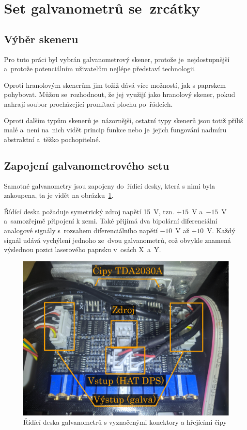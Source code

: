 \section{Set galvanometrů se~zrcátky} \label{sec:my-galvos}
\subsection{Výběr skeneru}
Pro tuto práci byl vybrán galvanometrový skener, protože je~nejdostupnější a~protože potenciálním uživatelům nejlépe představí technologii.

Oproti hranolovým skenerům jim tožiž dává více možností, jak s paprskem pohybovat.
Můžou se~rozhodnout, že jej využijí jako hranolový skener, pokud nahrají soubor procházející promítací plochu po~řádcích.

Oproti dalším typům skenerů je~názornější, ostatní typy skenerů jsou totiž příliš malé a~není na~nich vidět princip funkce nebo je~jejich fungování nadmíru abstraktní a~těžko pochopitelné.

\subsection{Zapojení galvanometrového setu}
Samotné galvanometry jsou zapojeny do~řídící desky, která s nimi byla zakoupena, ta je vidět na obrázku~\ref{fig:hw_galvoboard}.

Řídící deska požaduje symetrický zdroj napětí 15~V, tzn. $+15$~V a~$-15$~V a~samozřejmě připojení k zemi. Také přijímá dva bipolární diferenciální analogové signály s~rozsahem diferenciálního napětí $-10$~V až $+10$~V. Každý signál udává vychýlení jednoho ze~dvou galvanometrů, což obvykle znamená výslednou pozici laserového paprsku v~osách X~a~Y.

\begin{figure}[htb]
  \centering
  \includegraphics[width=1\textwidth]{img/hw_galvoboard.jpg}
  \caption{\label{fig:hw_galvoboard} Řídící deska galvanometrů s vyznačenými konektory a hřejícími čipy}
\end{figure}


